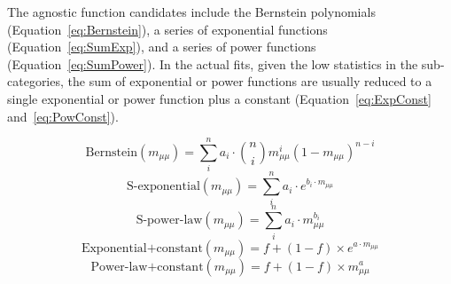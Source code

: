 The agnostic function candidates include the Bernstein polynomials (Equation~\ref{eq:Bernstein}), 
a series of exponential functions (Equation~\ref{eq:SumExp}), and a series of power functions (Equation~\ref{eq:SumPower}).
In the actual fits, given the low statistics in the \VH sub-categories, the sum of exponential or power functions are usually reduced to 
a single exponential or power function plus a constant (Equation~\ref{eq:ExpConst} and~\ref{eq:PowConst}).

\begin{equation}\label{eq:Bernstein}
  \mathrm{Bernstein}(m_{\mu\mu}) = \sum_{i}^{n} a_{i} \cdot \binom{n}{i} m_{\mu\mu}^{i}(1-m_{\mu\mu})^{n-i}
\end{equation}
\begin{equation}\label{eq:SumExp}
  \mathrm{S\textrm{-}exponential}(m_{\mu\mu}) = \sum_{i}^{n} a_{i} \cdot e^{b_{i} \cdot m_{\mu\mu}}
\end{equation}
\begin{equation}\label{eq:SumPower}
  \mathrm{S\textrm{-}power\textrm{-}law}(m_{\mu\mu}) = \sum_{i}^{n} a_{i} \cdot m_{\mu\mu}^{b_{i}}
\end{equation}
\begin{equation}\label{eq:ExpConst}
  \mathrm{Exponential\textrm{+}constant}(m_{\mu\mu}) = f+(1-f)\times e^{a\cdot m_{\mu\mu}}
\end{equation}
\begin{equation}\label{eq:PowConst}
  \mathrm{Power\textrm{-}law\textrm{+}constant}(m_{\mu\mu}) = f+(1-f)\times m_{\mu\mu}^{a}
\end{equation}

